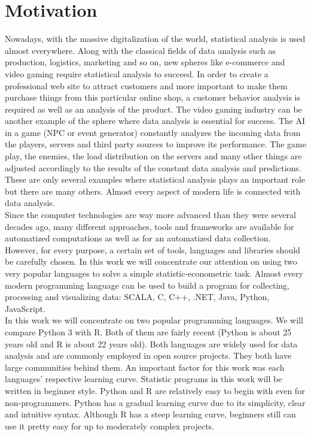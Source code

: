 \documentclass[
  twoside,
  12pt, a4paper,
  footinclude=true,
  headinclude=true,
  cleardoublepage=empty
]{article}
\begin{document}
\newpage
\section{Motivation}
Nowadays, with the massive digitalization of the world, statistical analysis is used almost everywhere. Along with the classical fields of data analysis such as production, logistics, marketing and so on, new spheres like e-commerce and video gaming require statistical analysis to succeed. In order to create a professional web site to attract customers and more important to make them purchase things from this particular online shop, a customer behavior analysis is required as well as an analysis of the product. The video gaming industry can be another example of the sphere where data analysis is essential for success. The AI in a game (NPC or event generator) constantly analyzes the incoming data from the players, servers and third party sources to improve its performance. The game play, the enemies, the load distribution on the servers and many other things are adjusted accordingly to the results of the constant data analysis and predictions. These are only several examples where statistical analysis plays an important role but there are many others. Almost every aspect of modern life is connected with data analysis.\vspace{3mm}\\
Since the computer technologies are way more advanced than they were several decades ago, many different approaches, tools and frameworks are available for automatized computations as well as for an automatized data collection. However, for every purpose, a certain set of tools, languages and libraries should be carefully chosen. In this work we will concentrate our attention on using two very popular languages to solve a simple statistic-econometric task. Almost every modern programming language can be used to build a program for collecting, processing and visualizing data: SCALA, C, C++, .NET, Java, Python, JavaScript.\vspace{3mm}\\
In this work we will concentrate on two popular programming languages. We will compare Python 3 with R. Both of them are fairly recent (Python is about 25 years old and R is about 22 years old). Both languages are widely used for data analysis and are commonly employed in open source projects. They both have large communities behind them. An important factor for this work was each languages' respective learning curve. Statistic programs in this work will be written in beginner style. Python and R are relatively easy to begin with even for non-programmers. Python has a gradual learning curve due to its simplicity, clear and intuitive syntax. Although R has a steep learning curve, beginners still can use it pretty easy for up to moderately complex projects.
\end{document}

